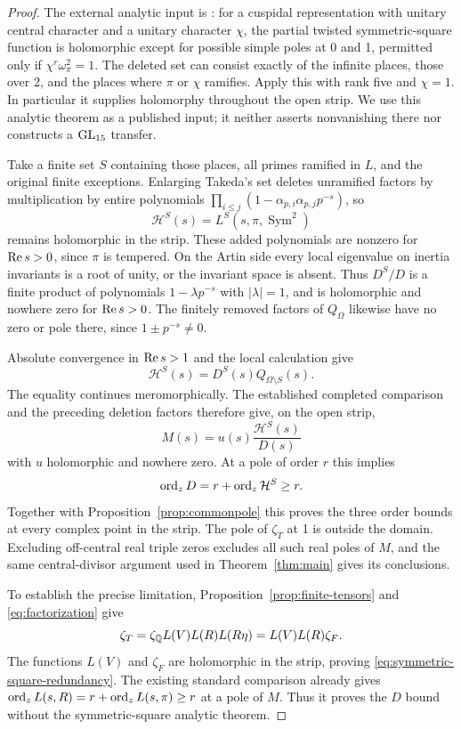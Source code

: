 \begin{proof}
The external analytic input is \citet[Theorem~7.1, pp.~49--50]{takeda2015}: for a cuspidal representation with unitary central character and a unitary character $\chi$, the partial twisted symmetric-square function is holomorphic except for possible simple poles at 0 and 1, permitted only if $\chi^r\omega_\pi^2=1$. The deleted set can consist exactly of the infinite places, those over 2, and the places where $\pi$ or $\chi$ ramifies. Apply this with rank five and $\chi=1$. In particular it supplies holomorphy throughout the open strip. We use this analytic theorem as a published input; it neither asserts nonvanishing there nor constructs a $\mathrm{GL}_{15}$ transfer.

Take a finite set $S$ containing those places, all primes ramified in $L$, and the original finite exceptions. Enlarging Takeda's set deletes unramified factors by multiplication by entire polynomials $\prod_{i\leq j}(1-\alpha_{p,i}\alpha_{p,j}p^{-s})$, so
\[
\mathcal H^S(s)=L^S(s,\pi,\operatorname{Sym}^2)
\]
remains holomorphic in the strip. These added polynomials are nonzero for $\operatorname{Re} s>0$, since $\pi$ is tempered. On the Artin side every local eigenvalue on inertia invariants is a root of unity, or the invariant space is absent. Thus $D^S/D$ is a finite product of polynomials $1-\lambda p^{-s}$ with $|\lambda|=1$, and is holomorphic and nowhere zero for $\operatorname{Re} s>0$. The finitely removed factors of $Q_\Omega$ likewise have no zero or pole there, since $1\pm p^{-s}\ne0$.

Absolute convergence in $\operatorname{Re} s>1$ and the local calculation give
\[
\mathcal H^S(s)=D^S(s)Q_{\Omega\setminus S}(s).
\]
The equality continues meromorphically. The established completed comparison and the preceding deletion factors therefore give, on the open strip,
\[
M(s)=u(s)\frac{\mathcal H^S(s)}{D(s)}
\]
with $u$ holomorphic and nowhere zero. At a pole of order $r$ this implies
\[
\operatorname{ord}_zD=r+\operatorname{ord}_z\mathcal H^S\geq r.
\]
Together with Proposition~\ref{prop:commonpole} this proves the three order bounds at every complex point in the strip. The pole of $\zeta_T$ at 1 is outside the domain. Excluding off-central real triple zeros excludes all such real poles of $M$, and the same central-divisor argument used in Theorem~\ref{thm:main} gives its conclusions.

To establish the precise limitation, Proposition~\ref{prop:finite-tensors} and \eqref{eq:factorization} give
\[
\zeta_T=\zeta_{\mathbb Q}L(V)L(R)L(R\eta)=L(V)L(R)\zeta_F.
\]
The functions $L(V)$ and $\zeta_F$ are holomorphic in the strip, proving \eqref{eq:symmetric-square-redundancy}. The existing standard comparison already gives $\operatorname{ord}_zL(s,R)=r+\operatorname{ord}_zL(s,\pi)\geq r$ at a pole of $M$. Thus it proves the $D$ bound without the symmetric-square analytic theorem.


\end{proof}

